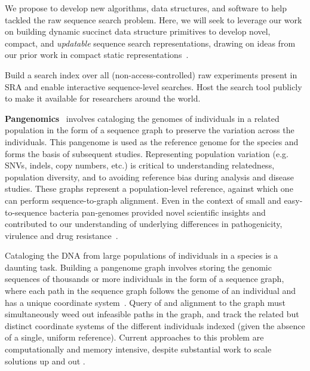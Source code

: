 We propose to develop new algorithms, data structures, and software to help tackled the raw sequence search problem. Here, we will seek to leverage our work on building dynamic succinct data structure primitives to develop novel, compact, and \emph{updatable} sequence search representations, drawing on ideas from our prior work in compact static representations~\cite{AlmodaresiPFJP19,Pibiri2023MacDBG}.

\begin{rproblem}%
Build a search index over all (non-access-controlled) raw experiments present in SRA and enable interactive sequence-level searches. Host the search tool publicly to make it available for researchers around the world.
\label{rprob:seq-search}
\end{rproblem}

\noindent
\textbf{Pangenomics}~\cite{sherman2020pan} involves cataloging the genomes of individuals in a related population in the form of a sequence graph to preserve the variation across the individuals. This pangenome is used as the reference genome for the species and forms the basis of subsequent studies. Representing population variation (e.g. SNVs, indels, copy numbers, etc.) is critical to understanding relatedness, population diversity, and to avoiding reference bias during analysis and disease studies. These graphs represent a population-level reference, against which one can perform sequence-to-graph alignment. Even in the context of small and easy-to-sequence bacteria pan-genomes provided novel scientific insights and contributed to our understanding of underlying differences in pathogenicity, virulence and drug resistance~\cite{sherman2020pan}.

Cataloging the DNA from large populations of individuals in a species is a daunting task. Building a pangenome graph involves storing the genomic sequences of thousands or more individuals in the form of a sequence graph, where each path in the sequence graph follows the genome of an individual and has a unique coordinate system~\cite{pandey2021variantstore}. Query of and alignment to the graph must simultaneously weed out infeasible paths in the graph, and track the related but distinct coordinate systems of the different individuals indexed (given the absence of a single, uniform reference). Current approaches to this problem are computationally and memory intensive, despite substantial work to scale solutions up and out \cite{garrison2018variation,pandey2021variantstore}.

